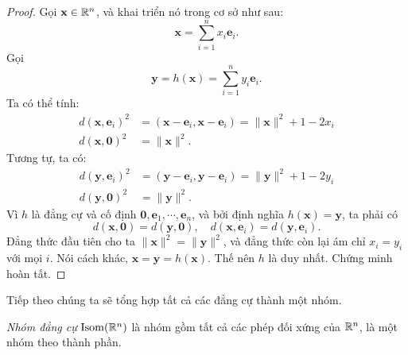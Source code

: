 \begin{proof}
  Gọi $\mathbf{x} \in \mathbb{R}^n$, và khai triển nó trong cơ sở như sau:
  \[
    \mathbf{x} = \sum_{i = 1}^n x_i \mathbf{e}_i.
  \]
  Gọi
  \[
    \mathbf{y} = h(\mathbf{x}) = \sum_{i = 1}^n y_i \mathbf{e}_i.
  \]
  Ta có thể tính:
  \begin{align*}
    d(\mathbf{x}, \mathbf{e}_i)^2 &= (\mathbf{x} - \mathbf{e}_i, \mathbf{x} - \mathbf{e}_i) = \|\mathbf{x}\|^2 + 1 - 2 x_i\\
    d(\mathbf{x}, \mathbf{0})^2 &= \|\mathbf{x}\|^2.
  \end{align*}
  Tương tự, ta có:
  \begin{align*}
    d(\mathbf{y}, \mathbf{e}_i)^2 &= (\mathbf{y} - \mathbf{e}_i, \mathbf{y} - \mathbf{e}_i) = \|\mathbf{y}\|^2 + 1 - 2 y_i\\
    d(\mathbf{y}, \mathbf{0})^2 &= \|\mathbf{y}\|^2.
  \end{align*}
  Vì $h$ là đẳng cự và cố định $\mathbf{0}, \mathbf{e}_1, \cdots, \mathbf{e}_n$, và bởi định nghĩa $h(\mathbf{x}) = \mathbf{y}$, ta phải có
  \[
    d(\mathbf{x}, \mathbf{0}) = d(\mathbf{y}, \mathbf{0}), \quad d(\mathbf{x}, \mathbf{e}_i) = d(\mathbf{y}, \mathbf{e}_i).
  \]
  Đẳng thức đầu tiên cho ta $\|\mathbf{x}\|^2 = \|\mathbf{y}\|^2$, và đẳng thức còn lại ám chỉ $x_i = y_i$ với mọi $i$. Nói cách khác, $\mathbf{x} = \mathbf{y} = h(\mathbf{x})$. Thế nên $h$ là duy nhất.
  Chứng minh hoàn tất.
\end{proof}

Tiếp theo chúng ta sẽ tổng hợp tất cả các đẳng cự thành một nhóm.
\begin{defi}
  \emph{Nhóm đẳng cự} $\operatorname{Isom}(\mathbb{R}^n)$ là nhóm gồm tất cả các phép đối xứng của $\mathbb{R}^n$, là một nhóm theo thành phần.
\end{defi}

